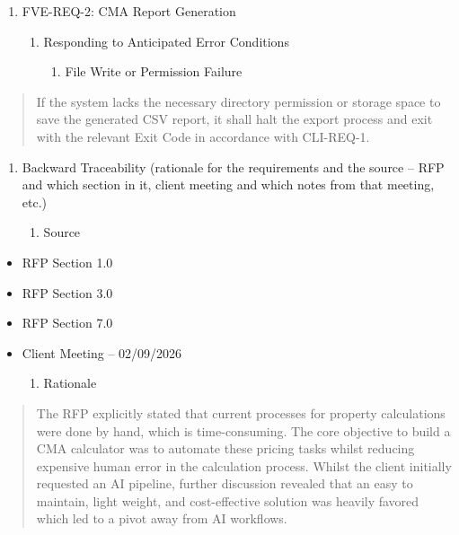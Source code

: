 \documentclass[
]{article}
\begin{document}
\begin{enumerate}
\def\labelenumi{\Roman{enumi})}
\setcounter{enumi}{1}
\item
  FVE-REQ-2: CMA Report Generation

  \begin{enumerate}
  \def\labelenumii{\alph{enumii}.}
  \item
    Responding to Anticipated Error Conditions

    \begin{enumerate}
    \def\labelenumiii{\roman{enumiii}.}
    \item
      File Write or Permission Failure
    \end{enumerate}
  \end{enumerate}
\end{enumerate}

\begin{quote}
If the system lacks the necessary directory permission or storage space
to save the generated CSV report, it shall halt the export process and
exit with the relevant Exit Code in accordance with CLI-REQ-1.
\end{quote}

\begin{enumerate}
\def\labelenumi{\alph{enumi}.}
\setcounter{enumi}{1}
\item
  Backward Traceability (rationale for the requirements and the source
  -- RFP and which section in it, client meeting and which notes from
  that meeting, etc.)

  \begin{enumerate}
  \def\labelenumii{\roman{enumii}.}
  \item
    Source
  \end{enumerate}
\end{enumerate}

\begin{itemize}
\item
  RFP Section 1.0
\item
  RFP Section 3.0
\item
  RFP Section 7.0
\item
  Client Meeting -- 02/09/2026

  \begin{enumerate}
  \def\labelenumi{\roman{enumi}.}
  \item
    Rationale
  \end{enumerate}
\end{itemize}

\begin{quote}
The RFP explicitly stated that current processes for property
calculations were done by hand, which is time-consuming. The core
objective to build a CMA calculator was to automate these pricing tasks
whilst reducing expensive human error in the calculation process. Whilst
the client initially requested an AI pipeline, further discussion
revealed that an easy to maintain, light weight, and cost-effective
solution was heavily favored which led to a pivot away from AI
workflows.
\end{quote}
\end{document}
